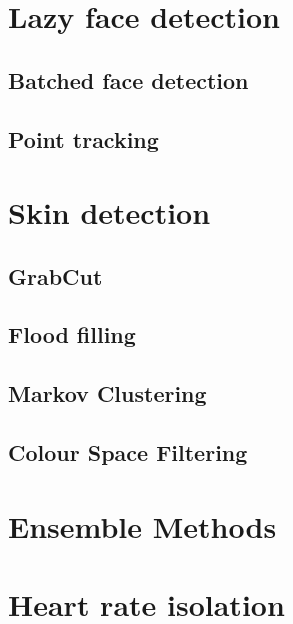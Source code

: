 \section{Lazy face detection}
\subsection{Batched face detection}
\subsection{Point tracking}


\section{Skin detection}
\subsection{GrabCut}
\subsection{Flood filling}
\subsection{Markov Clustering}
\subsection{Colour Space Filtering}

\section{Ensemble Methods}

\section{Heart rate isolation}